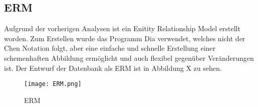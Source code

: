 \subsection{ERM}
\label{subsec:erm-diagram}

Aufgrund der vorherigen Analysen ist ein Enitity Relationship Model erstellt
worden. Zum Erstellen wurde das Programm Dia verwendet, welches nicht der Chen
Notation folgt, aber eine einfache und schnelle Erstellung einer schemenhaften Abbildung ermöglicht und auch flexibel gegenüber Veränderungen ist.
Der Entwurf der Datenbank als ERM ist in Abbildung X zu sehen.

\begin{figure}[H]
\centering
\texttt{[image: ERM.png]}
\caption{ERM}
\label{fig:erm}
\end{figure}

